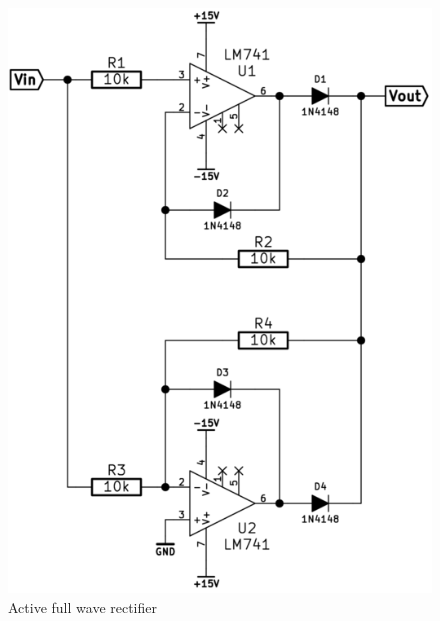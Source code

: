 \documentclass[]{article}
\begin{document}
\begin{figure}[htbp]
\centering
\includegraphics{img/fwr.png}
\caption{Active full wave rectifier}
\end{figure}
\end{document}

